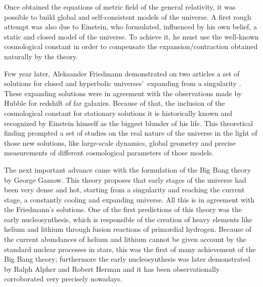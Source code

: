 Once obtained the equations of metric field of the general relativity, it 
was possible to build global and self-consistent models of the universe.
A first rough attempt was also due to Einstein, who formulated, influenced
by his own belief, a static and closed model of the universe. To achieve it,
he must use the well-known cosmological constant in order to compensate the
expansion/contraction obtained naturally by the theory.


Few year later, Aleksander Friedmann demonstrated on two articles a 
set of solutions for closed and hyperbolic universes'\ expanding from a
singularity \cite{FriedmanA} \cite{FriedmanB}. These expanding solutions 
were in agreement with the observations made by Hubble for redshift of 
far galaxies. Because of that, the inclusion of the cosmological constant 
for stationary solutions it is historically known and recognized by 
Einstein himself as the biggest blunder of his life. This theoretical 
finding prompted a set of studies on the real nature of the universe in 
the light of those new solutions, like large-scale dynamics, global 
geometry and precise measurements of different cosmological parameters of
those models.


The next important advance came with the formulation of the Big Bang 
theory by George Gamow. This theory proposes that early stages of 
the universe had been very dense and hot, starting from a singularity and 
reaching the current stage, a constantly cooling and expanding universe. 
All this is in agreement with the Friedmann's solutions. One of the first 
predictions of this theory was the early nucleosynthesis, which is 
responsible of the creation of heavy elements like helium and lithium 
through fusion reactions of primordial hydrogen. Because of the current 
abundances of helium and lithium cannot be given account by the standard
nuclear processes in stars, this was the first of many achievement of the 
Big Bang theory; furthermore the early nucleosynthesis was later 
demonstrated by Ralph Alpher and Robert Herman and it has been 
observationally corroborated very precisely nowadays.

